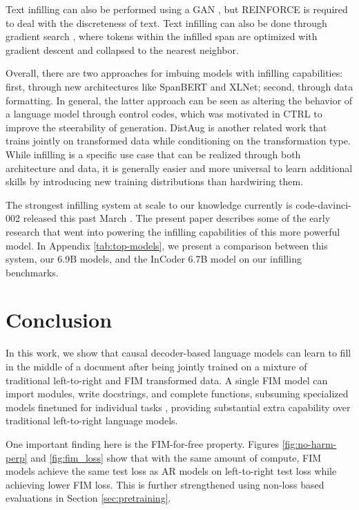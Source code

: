\documentclass[postscript]{article}
\begin{document}
Text infilling can also be performed using a GAN \citep{maskgan}, but REINFORCE is required to deal with the discreteness of text. Text infilling can also be done through gradient search \citep{tigs}, where tokens within the infilled span are optimized with gradient descent and collapsed to the nearest neighbor.


Overall, there are two approaches for imbuing models with infilling capabilities: first, through new architectures like SpanBERT and XLNet; second, through data formatting. In general, the latter approach can be seen as altering the behavior of a language model through control codes, which was motivated in CTRL \citep{ctrl} to improve the steerability of generation. DistAug \citep{distaug} is another related work that trains jointly on transformed data while conditioning on the transformation type. While infilling is a specific use case that can be realized through both architecture and data, it is generally easier and more universal to learn additional skills by introducing new training distributions than hardwiring them.

The strongest infilling system at scale to our knowledge currently is  code-davinci-002 released this past March \citep{edit_insert}. The present paper describes some of the early research that went into powering the infilling capabilities of this more powerful model. In Appendix \ref{tab:top-models}, we present a comparison between this system, our 6.9B models, and the InCoder 6.7B model on our infilling benchmarks. 

\section{Conclusion}\label{sec:conclusion}

In this work, we show that causal decoder-based language models can learn to fill in the middle of a document after being jointly trained on a mixture of traditional left-to-right  and FIM transformed data. A single FIM model can import modules, write docstrings, and complete functions, subsuming specialized models finetuned for individual tasks \citep{codex}, providing substantial extra capability over traditional left-to-right language models.

One important finding here is the FIM-for-free property. Figures \ref{fig:no-harm-perp} and \ref{fig:fim_loss} show that with the same amount of compute, FIM models achieve the same test loss as AR models on left-to-right test loss while achieving lower FIM loss. This is further strengthened using non-loss based evaluations in Section \ref{sec:pretraining}.
\end{document}
